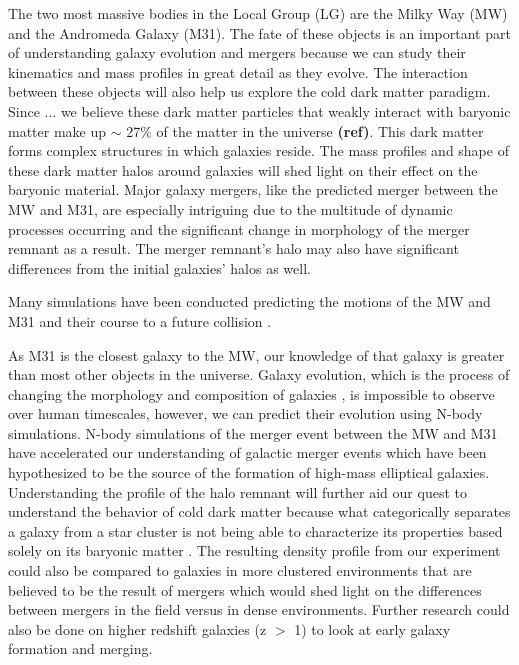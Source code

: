 \documentclass[linenumbers, twocolumn]{aastex631}
\begin{document}
The two most massive bodies in the Local Group (LG) are the Milky Way (MW) and the Andromeda Galaxy (M31). The fate of these objects is an important part of understanding galaxy evolution and mergers because we can study their kinematics and mass profiles in great detail as they evolve. The interaction between these objects will also help us explore the cold dark matter paradigm. Since ... we believe these dark matter particles that weakly interact with baryonic matter make up $\sim$ 27\% of the matter in the universe \textbf{(ref)}. This dark matter forms complex structures in which galaxies reside. The mass profiles and shape of these dark matter halos around galaxies will shed light on their effect on the baryonic material. Major galaxy mergers, like the predicted merger between the MW and M31, are especially intriguing due to the multitude of dynamic processes occurring and the significant change in morphology of the merger remnant as a result. The merger remnant's halo may also have significant differences from the initial galaxies' halos as well.

Many simulations have been conducted predicting the motions of the MW and M31 and their course to a future collision \citep[e.g.,][]{2012VanDerMarel}.

As M31 is the closest galaxy to the MW, our knowledge of that galaxy is greater than most other objects in the universe. Galaxy evolution, which is the process of changing the morphology and composition of galaxies \citep{2004galaxyevolutiondef}, is impossible to observe over human timescales, however, we can predict their evolution using N-body simulations.
N-body simulations of the merger event between the MW and M31 have accelerated our understanding of galactic merger events which have been hypothesized to be the source of the formation of high-mass elliptical galaxies. 
Understanding the profile of the halo remnant will further aid our quest to understand the behavior of cold dark matter because what categorically separates a galaxy from a star cluster is not being able to characterize its properties based solely on its baryonic matter \citep{2012Galaxydef}.
The resulting density profile from our experiment could also be compared to galaxies in more clustered environments that are believed to be the result of mergers which would shed light on the differences between mergers in the field versus in dense environments.
Further research could also be done on higher redshift galaxies (z $>$ 1) to look at early galaxy formation and merging.
\end{document}

